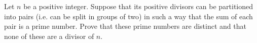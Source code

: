 Let $n$ be a positive integer. Suppose that its positive divisors can be partitioned into pairs (i.e. can be split in groups of two) in such a way that the sum of each pair is a prime number. Prove that these prime numbers are distinct and that none of these are a divisor of $n.$
